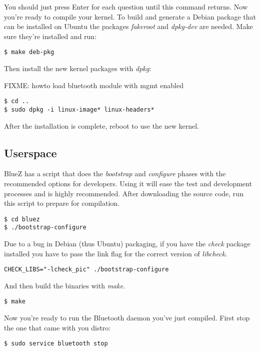 \documentclass[11pt]{article}
\begin{document}
You should just press Enter for each question until this command returns. Now
you're ready to compile your kernel. To build and generate a Debian package
that can be installed on Ubuntu the packages {\em fakeroot} and {\em dpkg-dev}
are needed.  Make sure they're installed and run:

\begin{verbatim}
$ make deb-pkg
\end{verbatim}

Then install the new kernel packages with {\em dpkg}:

FIXME: howto load bluetooth module with mgmt enabled

\begin{verbatim}
$ cd ..
$ sudo dpkg -i linux-image* linux-headers*
\end{verbatim}

After the installation is complete, reboot to use the new kernel.

\subsection{Userspace}

BlueZ has a script that does the {\em bootstrap} and {\em configure} phases
with the recommended options for developers. Using it will ease the test and
development processes and is highly recommended. After downloading the source
code, run this script to prepare for compilation.

\begin{verbatim}
$ cd bluez
$ ./bootstrap-configure
\end{verbatim}

Due to a bug in Debian (thus Ubuntu) packaging, if you have the {\em check}
package installed you have to pass the link flag for the correct version of
{\em libcheck}.

\begin{verbatim}
CHECK_LIBS="-lcheck_pic" ./bootstrap-configure
\end{verbatim}

And then build the binaries with {\em make}.

\begin{verbatim}
$ make
\end{verbatim}

Now you're ready to run the Bluetooth daemon you've just compiled. First stop
the one that came with you distro:

\begin{verbatim}
$ sudo service bluetooth stop
\end{verbatim}
\end{document}
